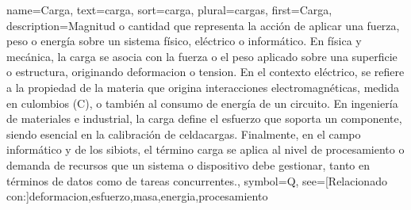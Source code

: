 	{
		name={Carga},
		text={carga},
		sort={carga},
		plural={cargas},
		first={Carga},
		description={Magnitud o cantidad que representa la acci{\'o}n de aplicar una fuerza, peso o energ{\'i}a sobre un sistema f{\'i}sico, el{\'e}ctrico o inform{\'a}tico. 
			En f{\'i}sica y mec{\'a}nica, la carga se asocia con la fuerza o el peso aplicado sobre una superficie o estructura, originando \gls{deformacion} o \gls{tension}. 
			En el contexto el{\'e}ctrico, se refiere a la propiedad de la materia que origina interacciones electromagn{\'e}ticas, medida en culombios (C), o tambi{\'e}n al consumo de energ{\'i}a de un circuito. 
			En ingenier{\'i}a de materiales e industrial, la carga define el esfuerzo que soporta un componente, siendo esencial en la calibraci{\'o}n de \glspl{celdacarga}. 
			Finalmente, en el campo inform{\'a}tico y de los \glspl{sibiot}, el t{\'e}rmino carga se aplica al nivel de procesamiento o demanda de recursos que un \gls{sistema} o \gls{dispositivo} debe gestionar, tanto en t{\'e}rminos de datos como de tareas concurrentes.},
		symbol={Q},
		see=[Relacionado con:]{deformacion,esfuerzo,masa,energia,procesamiento}
	}
	
	
